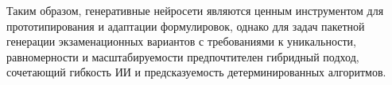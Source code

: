 Таким образом, генеративные нейросети являются ценным инструментом для прототипирования и адаптации формулировок,
однако для задач пакетной генерации экзаменационных вариантов с требованиями к уникальности, равномерности и масштабируемости предпочтителен гибридный подход,
сочетающий гибкость ИИ и предсказуемость детерминированных алгоритмов.


